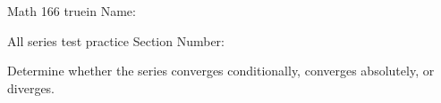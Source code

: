 \documentclass[12pt]{article}
\theoremstyle{definition}
\theoremstyle{remark}
\begin{document}
\pagestyle{empty} %

\noindent
{Math 166  truein  Name:\ \hrulefill}

\noindent
{All series test practice}
\noindent \hspace{2.5in} Section Number: \hrulefill
\bigskip


Determine whether the series converges conditionally, converges absolutely, or diverges.
\end{document}

